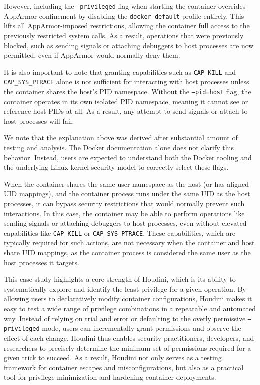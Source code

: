 \documentclass[12pt]{report}
\begin{document}
\begin{doublespace}
However, including the \texttt{--privileged} flag when starting the container overrides AppArmor confinement by disabling the \texttt{docker-default} profile entirely. This lifts all AppArmor-imposed restrictions, allowing the container full access to the previously restricted system calls. As a result, operations that were previously blocked, such as sending signals or attaching debuggers to host processes are now permitted, even if AppArmor would normally deny them.

It is also important to note that granting capabilities such as \texttt{CAP\_KILL} and \texttt{CAP\_SYS\_PTRACE} alone is not sufficient for interacting with host processes unless the container shares the host’s PID namespace. Without the \texttt{--pid=host} flag, the container operates in its own isolated PID namespace, meaning it cannot see or reference host PIDs at all. As a result, any attempt to send signals or attach to host processes will fail.

We note that the explanation above was derived after substantial amount of testing and analysis. The Docker documentation alone does not clarify this behavior. Instead, users are expected to understand both the Docker tooling and the underlying Linux kernel security model to correctly select these flags. 

When the container shares the same user namespace as the host (or has aligned UID mappings), and the container process runs under the same UID as the host processes, it can bypass security restrictions that would normally prevent such interactions. In this case, the container may be able to perform operations like sending signals or attaching debuggers to host processes, even without elevated capabilities like \texttt{CAP\_KILL} or \texttt{CAP\_SYS\_PTRACE}. These capabilities, which are typically required for such actions, are not necessary when the container and host share UID mappings, as the container process is considered the same user as the host processes it targets.

This case study highlights a core strength of Houdini, which is its ability to systematically explore and identify the least privilege for a given operation. By allowing users to declaratively modify container configurations, Houdini makes it easy to test a wide range of privilege combinations in a repeatable and automated way. Instead of relying on trial and error or defaulting to the overly permissive \texttt{--privileged} mode, users can incrementally grant permissions and observe the effect of each change. Houdini thus enables security practitioners, developers, and researchers to precisely determine the minimum set of permissions required for a given trick to succeed. As a result, Houdini not only serves as a testing framework for container escapes and misconfigurations, but also as a practical tool for privilege minimization and hardening container deployments.


\end{doublespace}
\end{document}
